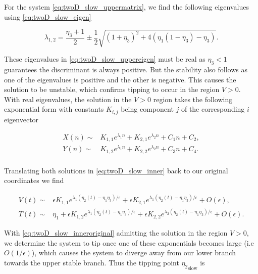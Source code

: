 For the system \eqref{eq:twoD_slow_uppermatrix}, we find the following eigenvalues using \eqref{eq:twoD_slow_eigen}

\begin{equation}\label{eq:twoD_slow_uppereigen}
\lambda_{1,2}=\frac{\eta_3+1}{2}\pm\frac{1}{2}\sqrt{(1+\eta_3)^2+4(\eta_1(1-\eta_3)-\eta_3)}.
\end{equation}

These eigenvalues in \eqref{eq:twoD_slow_uppereigen} must be real as $\eta_3<1$ guarantees the discriminant is always positive. But the stability also follows as one of the eigenvalues is positive and the other is negative. This causes the solution to be unstable, which confirms tipping to occur in the region $V>0$. With real eigenvalues, the solution in the $V>0$ region takes the following exponential form with constants $K_{i,j}$ being component $j$ of the corresponding $i$ eigenvector 

\begin{equation}\label{eq:twoD_slow_innersoln}
\begin{aligned}
X(n)\sim& K_{1,1}e^{\lambda_1 n}+K_{2,1}e^{\lambda_2 n}+C_1 n+C_2,\\
Y(n)\sim& K_{1,2}e^{\lambda_1 n}+K_{2,2}e^{\lambda_2 n}+C_3 n+C_4.\\
\end{aligned}
\end{equation}

Translating both solutions in \eqref{eq:twoD_slow_inner} back to our original coordinates we find

\begin{equation}\label{eq:twoD_slow_inneroriginal}
\begin{aligned}
V(t)\sim&  \epsilon K_{1,1}e^{\lambda_1(\eta_2(t)-\eta_1\eta_3)/\epsilon}+\epsilon K_{2,1}e^{\lambda_1(\eta_2(t)-\eta_1\eta_3)/\epsilon}+O(\epsilon),\\
T(t)\sim& \eta_1+ \epsilon K_{1,2}e^{\lambda_1 (\eta_2(t)-\eta_1\eta_3)/\epsilon}+\epsilon K_{2,2}e^{\lambda_2 (\eta_2(t)-\eta_1\eta_3)/\epsilon}+O(\epsilon).
\end{aligned}
\end{equation}

With \eqref{eq:twoD_slow_inneroriginal} admitting the solution in the region $V>0$, we determine the system to tip once one of these exponentials becomes large (i.e $O(1/\epsilon)$), which causes the system to diverge away from our lower branch towards the upper stable branch. Thus the tipping point ${\eta_2}_{\text{slow}}$ is

